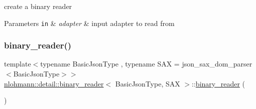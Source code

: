 create a binary reader 


\begin{DoxyParams}[1]{Parameters}
\mbox{\tt in}  & {\em adapter} & input adapter to read from \\
\hline
\end{DoxyParams}
\mbox{\label{classnlohmann_1_1detail_1_1binary__reader_aacbece7dfa1698dfb3f22c90922d7244}} 
\subsubsection{\texorpdfstring{binary\+\_\+reader()}{binary\_reader()}\hspace{0.1cm}{\footnotesize\ttfamily [2/3]}}
{\footnotesize\ttfamily template$<$typename Basic\+Json\+Type , typename S\+AX  = json\+\_\+sax\+\_\+dom\+\_\+parser$<$\+Basic\+Json\+Type$>$$>$ \\
\hyperlink{classnlohmann_1_1detail_1_1binary__reader}{nlohmann\+::detail\+::binary\+\_\+reader}$<$ Basic\+Json\+Type, S\+AX $>$\+::\hyperlink{classnlohmann_1_1detail_1_1binary__reader}{binary\+\_\+reader} (\begin{DoxyParamCaption}\item[{const \hyperlink{classnlohmann_1_1detail_1_1binary__reader}{binary\+\_\+reader}$<$ Basic\+Json\+Type, S\+AX $>$ \&}]{ }\end{DoxyParamCaption})\hspace{0.3cm}{\ttfamily [delete]}}

\mbox{\label{classnlohmann_1_1detail_1_1binary__reader_a254d91b10c2f4579634b6f70ffc1ef16}} 
